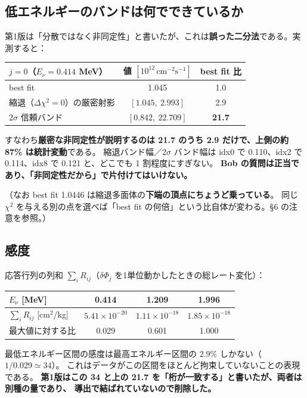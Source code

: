 \documentclass[11pt,a4paper]{ltjsarticle}
\newcommand{\dP}{\delta\Phi}
\newcommand{\Ev}{E_\nu}
\begin{document}
\subsection{低エネルギーのバンドは何でできているか}
第1版は「分散ではなく非同定性」と書いたが、これは\textbf{誤った二分法}である。実測すると：
\begin{center}\small
\begin{tabular}{lcc}
\toprule
$j=0$（$\Ev=0.414$ MeV）& 値 $[10^{12}\,\mathrm{cm^{-2}s^{-1}}]$ & best fit 比 \\
\midrule
best fit & 1.045 & 1.0 \\
縮退（$\Delta\chi^2=0$）の厳密射影 & $[1.045,\ 2.993]$ & 2.9 \\
$2\sigma$ 信頼バンド & $[0.842,\ 22.709]$ & \textbf{21.7} \\
\bottomrule
\end{tabular}
\end{center}
すなわち\textbf{厳密な非同定性が説明するのは 21.7 のうち 2.9 だけで、上側の約 87\% は統計変動}である。
縮退バンド幅／$2\sigma$ バンド幅は idx0 で 0.110、idx2 で 0.114、idx8 で 0.121 と、どこでも 1 割程度にすぎない。
\textbf{Bob の質問は正当であり、「非同定性だから」で片付けてはいけない。}

（なお best fit 1.0446 は縮退多面体の\textbf{下端の頂点にちょうど乗っている}。
同じ $\chi^2$ を与える別の点を選べば「best fit の何倍」という比自体が変わる。\S6 の注意を参照。）

\subsection{感度}
応答行列の列和 $\sum_i R_{ij}$（$\dP_j$ を1単位動かしたときの総レート変化）：
\begin{center}\small
\begin{tabular}{lccc}
\toprule
$\Ev$ [MeV] & 0.414 & 1.209 & 1.996 \\
\midrule
$\sum_i R_{ij}$ [cm$^2$/kg] & $5.41\times10^{-20}$ & $1.11\times10^{-18}$ & $1.85\times10^{-18}$\\
最大値に対する比 & 0.029 & 0.601 & 1.000\\
\bottomrule
\end{tabular}
\end{center}
最低エネルギー区間の感度は最高エネルギー区間の $2.9\%$ しかない（$1/0.029\simeq34$）。
これはデータがこの区間をほとんど拘束していないことの表現である。
\textbf{第1版はこの 34 と上の 21.7 を「桁が一致する」と書いたが、両者は別種の量であり、
導出で結ばれていないので削除した。}
\end{document}
